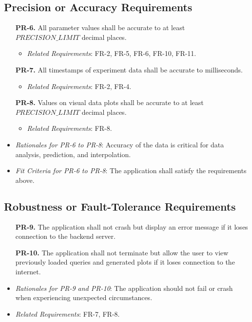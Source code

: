 \documentclass[12pt]{article}
\begin{document}
\subsection{Precision or Accuracy Requirements}
\begin{enumerate}
  \item[\textbf{PR-6.}] All parameter values shall be accurate to at least \\
  $PRECISION\_LIMIT$ decimal places. 
    \begin{itemize}
      \item \textit{Related Requirements}: FR-2, FR-5, FR-6, FR-10, FR-11.
    \end{itemize}
  \item[\textbf{PR-7.}] All timestamps of experiment data shall be accurate to milliseconds.
    \begin{itemize}
      \item \textit{Related Requirements}: FR-2, FR-4.
    \end{itemize}
  \item[\textbf{PR-8.}] Values on visual data plots shall be accurate to at
  least \\ $PRECISION\_LIMIT$ decimal places.
    \begin{itemize}
        \item \textit{Related Requirements}: FR-8.
    \end{itemize}
\end{enumerate}
\begin{itemize}
  \item \textit{Rationales for PR-6 to PR-8}: Accuracy of the data is critical for data analysis, prediction, and interpolation.
  \item \textit{Fit Criteria for PR-6 to PR-8}: The application shall satisfy the requirements above.
\end{itemize}

\subsection{Robustness or Fault-Tolerance Requirements}
\begin{enumerate}
  \item[\textbf{PR-9.}] The application shall not crash but display an error message if it loses connection to the backend server.
  \item[\textbf{PR-10.}] The application shall not terminate but allow the user to view previously loaded queries and generated plots if it loses connection to the internet.
\end{enumerate}
\begin{itemize}
  \item \textit{Rationales for PR-9 and PR-10}: The application should not fail or crash when experiencing unexpected circumstances.
  \item \textit{Related Requirements}: FR-7, FR-8.
\end{itemize}
\end{document}
